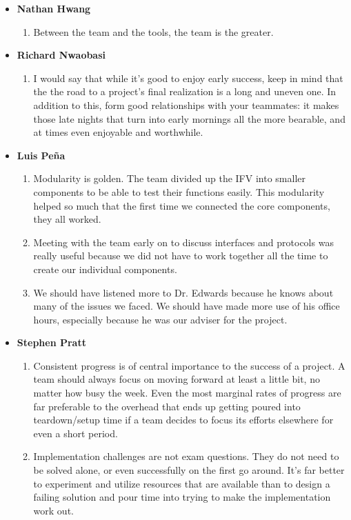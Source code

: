 \documentclass{article}
\begin{document}
\begin{itemize}

\item
\textbf{Nathan Hwang}
\begin{enumerate}
\item Between the team and the tools, the team is the greater.
\end{enumerate}

\item 
\textbf{Richard Nwaobasi}
\begin{enumerate}
\item I would say that while it's good to enjoy early success, keep in mind that the the road to a project's final realization is a long and uneven one. In addition to this, form good relationships with your teammates: it makes those late nights that turn into early mornings all the more bearable, and at times even enjoyable and worthwhile.
\end{enumerate}

\item 
\textbf{Luis Pe\~{n}a}
\begin{enumerate}
\item Modularity is golden. The team divided up the IFV into smaller components to be able to test their functions easily. This modularity helped so much that the first time we connected the core components, they all worked.
\item Meeting with the team early on to discuss interfaces and protocols was really useful because we did not have to work together all the time to create our individual components.
\item We should have listened more to Dr. Edwards because he knows about many of the issues we faced. We should have made more use of his office hours, especially because he was our adviser for the project. 
\end{enumerate}

\item 
\textbf{Stephen Pratt}
\begin{enumerate}
\item Consistent progress is of central importance to the success of a project. A team should always focus on 
moving forward at least a little bit, no matter how busy the week. Even the most marginal rates of progress are far preferable
to the overhead that ends up getting poured into teardown/setup time if a team decides to focus its efforts elsewhere
for even a short period.
\item Implementation challenges are not exam questions. They do not need to be solved alone, or even successfully on 
the first go around. It's far better to experiment and utilize resources that are available than to design a failing
solution and pour time into trying to make the implementation work out.
\end{enumerate}

\end{itemize}
\end{document}
